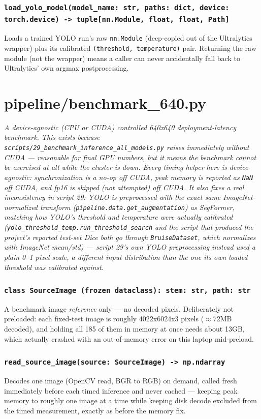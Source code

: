 \documentclass[11pt]{article}
\newcommand{\role}[1]{\par\noindent\textit{#1}\par\vspace{0.5em}}
\newcommand{\func}[1]{\subsubsection*{\texttt{#1}}}
\begin{document}
\func{load\_yolo\_model(model\_name: str, paths: dict, device: torch.device) -> tuple[nn.Module, float, float, Path]}
Loads a trained YOLO run's raw \texttt{nn.Module} (deep-copied out of the
Ultralytics wrapper) plus its calibrated \texttt{(threshold, temperature)} pair.
Returning the raw module (not the wrapper) means a caller can never accidentally
fall back to Ultralytics' own argmax postprocessing.

\newpage
\section{pipeline/benchmark\_640.py}
\role{A device-agnostic (CPU or CUDA) controlled 640x640 deployment-latency
benchmark. This exists because \texttt{scripts/29\_benchmark\_inference\_all\_models.py}
raises immediately without CUDA --- reasonable for final GPU numbers, but it
means the benchmark cannot be exercised at all while the cluster is down. Every
timing helper here is device-agnostic: synchronization is a no-op off CUDA,
peak memory is reported as \texttt{NaN} off CUDA, and fp16 is skipped (not
attempted) off CUDA. It also fixes a real inconsistency in script 29: YOLO is
preprocessed with the exact same ImageNet-normalized transform
(\texttt{pipeline.data.get\_augmentation}) as SegFormer, matching how YOLO's
threshold and temperature were actually calibrated
(\texttt{yolo\_threshold\_temp.run\_threshold\_search} and the script that
produced the project's reported test-set Dice both go through
\texttt{BruiseDataset}, which normalizes with ImageNet mean/std) --- script 29's
own YOLO preprocessing instead used a plain 0--1 pixel scale, a different input
distribution than the one its own loaded threshold was calibrated against.}

\func{class SourceImage (frozen dataclass): stem: str, path: str}
A benchmark image \emph{reference} only --- no decoded pixels. Deliberately not
preloaded: each fixed-test image is roughly 4022x6024x3 pixels ($\approx$72MB
decoded), and holding all 185 of them in memory at once needs about 13GB, which
actually crashed with an out-of-memory error on this laptop mid-preload.

\func{read\_source\_image(source: SourceImage) -> np.ndarray}
Decodes one image (OpenCV read, BGR to RGB) on demand, called fresh immediately
before each timed inference and never cached --- keeping peak memory to roughly
one image at a time while keeping disk decode excluded from the timed
measurement, exactly as before the memory fix.
\end{document}
